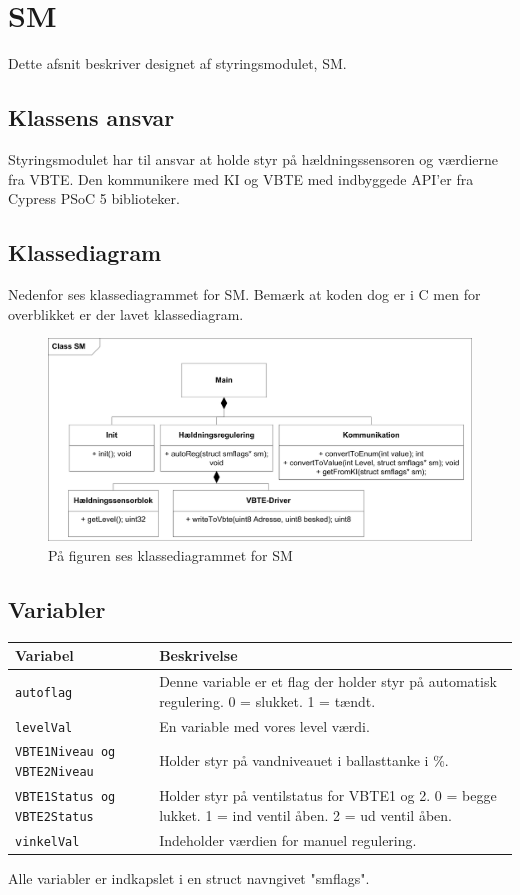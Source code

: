 \chapter{SM}
Dette afsnit beskriver designet af styringsmodulet, SM.
\section{Klassens ansvar}
Styringsmodulet har til ansvar at holde styr på hældningssensoren og værdierne fra VBTE. Den kommunikere med KI og VBTE med indbyggede API'er fra Cypress PSoC 5 biblioteker. 
\section{Klassediagram}
Nedenfor ses klassediagrammet for SM. Bemærk at koden dog er i C men for overblikket er der lavet klassediagram.
\begin{figure}[H]
\centering
\includegraphics[width=1\textwidth]{billeder/smKlassediagram}
\caption{På figuren ses klassediagrammet for SM}
\end{figure}
\section{Variabler}
\begin{table}[H]
\begin{tabular}{|l|p{10cm}|}
\hline
\cellcolor[gray]{0.8}\textbf{Variabel} &\cellcolor[gray]{0.8} \textbf{Beskrivelse}\\ \hline
\texttt{autoflag} & Denne variable er et flag der holder styr på automatisk regulering. 0 = slukket. 1 = tændt.\\ \hline
\texttt{levelVal} & En variable med vores level værdi.\\ \hline
\texttt{VBTE1Niveau og VBTE2Niveau} & Holder styr på vandniveauet i ballasttanke i \%. \\ \hline
\texttt{VBTE1Status og VBTE2Status} & Holder styr på ventilstatus for  VBTE1 og 2. 0 = begge lukket. 1 = ind ventil åben. 2 = ud ventil åben.\\ \hline
\texttt{vinkelVal} & Indeholder værdien for manuel regulering.\\ \hline
\end{tabular}
\end{table}
Alle variabler er indkapslet i en struct navngivet "smflags".
